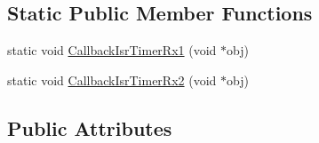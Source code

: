\subsection*{Static Public Member Functions}
\begin{DoxyCompactItemize}
\item 
static void \mbox{\hyperlink{class_lora_wan_container_a9fd5d073c605e78e404c4aa7caa6a228}{Callback\+Isr\+Timer\+Rx1}} (void $\ast$obj)
\item 
static void \mbox{\hyperlink{class_lora_wan_container_a49723c3a1e4fbff723372d8f097c45e9}{Callback\+Isr\+Timer\+Rx2}} (void $\ast$obj)
\end{DoxyCompactItemize}
\subsection*{Public Attributes}
